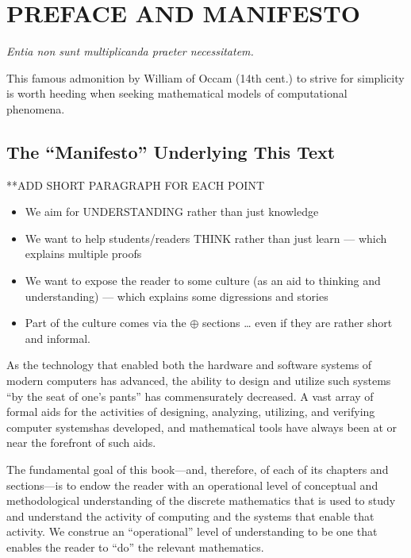 
\chapter*{PREFACE AND MANIFESTO}


\begin{center}
{\it Entia non sunt multiplicanda praeter necessitatem.} \\
\end{center}

\noindent
This famous admonition by William of Occam (14th cent.) to strive for
simplicity is worth heeding when seeking mathematical models of
computational phenomena.

\section{The ``Manifesto'' Underlying This Text}
\label{sec:Manifesto}

**ADD SHORT PARAGRAPH FOR EACH POINT

\begin{itemize}
\item
We aim for UNDERSTANDING rather than just knowledge
\item
We want to help students/readers THINK rather than just learn —
which explains multiple proofs
\item
We want to expose the reader to some culture (as an aid to thinking
and understanding) — which explains some digressions and stories
\item
Part of the culture comes via the $\oplus$ sections … even if they are
rather short and informal.
\end{itemize}




As the technology that enabled both the hardware and software systems
of modern computers has advanced, the ability to design and utilize
such systems ``by the seat of one's pants'' has commensurately
decreased.  A vast array of formal aids for the activities of
designing, analyzing, utilizing, and verifying computer systemshas
developed, and mathematical tools have always been at or near the
forefront of such aids.

The fundamental goal of this book---and, therefore, of each of its
chapters and sections---is to endow the reader with an operational
level of conceptual and methodological understanding of the discrete
mathematics that is used to study and understand the activity of
computing and the systems that enable that activity.  We construe an
``operational'' level of understanding to be one that enables the
reader to ``do'' the relevant mathematics.

